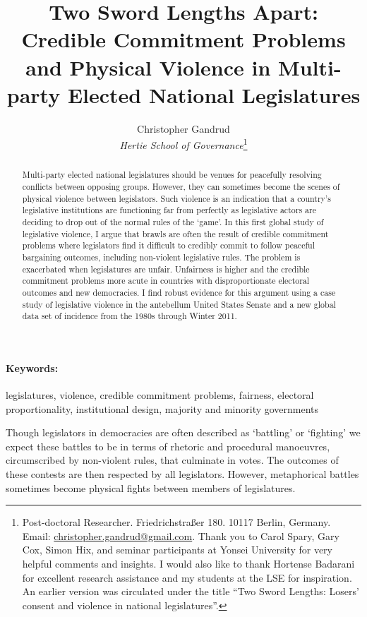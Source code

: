 \documentclass[a4paper]{article}\usepackage[]{graphicx}\usepackage[]{color}
\title{Two Sword Lengths Apart: Credible Commitment Problems and Physical Violence in Multi-party Elected National Legislatures}
\author{Christopher Gandrud \\
                {\emph{Hertie School of Governance}}\footnote{Post-doctoral Researcher. Friedrichstra{\ss}er 180. 10117 Berlin, Germany. Email: \href{mailto:christopher.gandrud@gmail.com}{christopher.gandrud@gmail.com}. Thank you to Carol Spary, Gary Cox, Simon Hix, and seminar participants at Yonsei University for very helpful comments and insights. I would also like to thank Hortense Badarani for excellent research assistance and my students at the LSE for inspiration. An earlier version was circulated under the title ``Two Sword Lengths: Losers' consent and violence in national legislatures''.}}
\begin{document}
\maketitle

\begin{abstract}
Multi-party elected national legislatures should be venues for peacefully resolving conflicts between opposing groups. However, they can sometimes become the scenes of physical violence between legislators. Such violence is an indication that a country's legislative institutions are functioning far from perfectly as legislative actors are deciding to drop out of the normal rules of the `game'. In this first global study of legislative violence, I argue that brawls are often the result of credible commitment problems where legislators find it difficult to credibly commit to follow peaceful bargaining outcomes, including non-violent legislative rules. The problem is exacerbated when legislatures are unfair. Unfairness is higher and the credible commitment problems more acute in countries with disproportionate electoral outcomes and new democracies. I find robust evidence for this argument using a case study of legislative violence in the antebellum United States Senate and a new global data set of incidence from the 1980s through Winter 2011.
\end{abstract}


\paragraph{Keywords:} legislatures, violence, credible commitment problems, fairness, electoral proportionality, institutional design, majority and minority governments

\vspace{0.3cm}


Though legislators in democracies are often described as `battling' or `fighting' we expect these battles to be in terms of rhetoric and procedural manoeuvres, circumscribed by non-violent rules, that culminate in votes. The outcomes of these contests are then respected by all legislators. However, metaphorical battles sometimes become physical fights between members of legislatures. 
\end{document}

